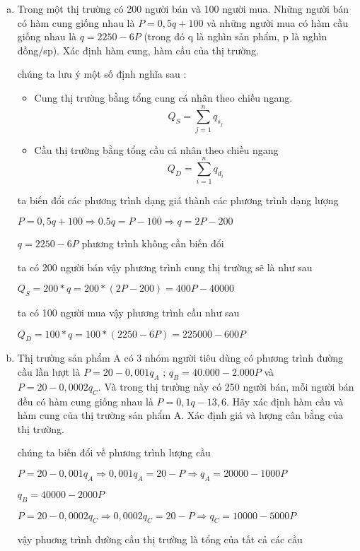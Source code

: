 \begin{enumerate}[a.]
    \item Trong một thị trường có 200 người bán và 100 người mua. Những người bán có hàm 
    cung giống nhau là $P = 0,5q + 100$ và những người mua có hàm cầu giống nhau là
    $q = 2250 - 6P$ (trong đó q là nghìn sản phẩm, p là nghìn đồng/sp). Xác định hàm cung, 
    hàm cầu của thị trường.

    chúng ta lưu ý một số định nghĩa sau :
    \begin{itemize}
        \item Cung thị trường bằng tổng cung cá nhân theo chiều ngang. 
        \[ Q_S = \sum_{j=1}^n q_{s_j} \]
        \item Cầu thị trường bằng tổng 
        cầu cá nhân theo chiều  ngang
        \[ Q_D = \sum_{i=1}^n q_{d_i} \]
    \end{itemize}

    ta biến đổi các phương trình dạng giá thành các phương trình dạng lượng 

    $P = 0,5q + 100 \Rightarrow 0.5q = P - 100 \Rightarrow q = 2P - 200$

    $q = 2250 - 6P$ phương trình không cần biến đổi

    ta có 200 người bán vậy phương trình cung thị trường sẽ là như sau

    $Q_S = 200 * q = 200 * (2P - 200) = 400P - 40000$

    ta có 100 người mua vậy phương trình cầu như sau

    $Q_D = 100 * q = 100 * (2250 - 6P) = 225000 - 600P$
    
    \item  Thị trường sản phẩm A có 3 nhóm người tiêu dùng có phương trình đường cầu lần lượt là 
    $P = 20 - 0,001q_A$ ; $q_B = 40.000 - 2.000P$ và $P = 20 - 0,0002q_C$. Và trong thị trường này có 
    250 người bán, mỗi người bán đều có hàm cung giống nhau là $P = 0,1q - 13,6$. Hãy xác định 
    hàm cầu và hàm cung của thị trường sản phẩm A. Xác định giá và lượng cân bằng của thị 
    trường.

    chúng ta biến đổi về phương trình lượng cầu

    $P = 20 - 0,001q_A \Rightarrow 0,001q_A = 20 - P \Rightarrow q_A = 20000 - 1000P$ 
    
    $q_B = 40000 - 2000P$ 
    
    $P = 20 - 0,0002q_C \Rightarrow 0,0002q_C = 20 - P \Rightarrow q_C = 10000 - 5000P$

    vậy phuơng trình đường cầu thị trường là tổng của tất cả các cầu


\end{enumerate}
